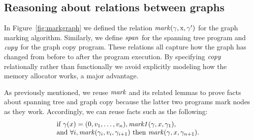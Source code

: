 
\vspace{-0.75ex}
\subsection{Reasoning about relations between graphs} %
\vspace{-0.75ex}
In Figure~\ref{fig:markgraph} we defined the relation $\mathit{mark}(\gamma, \text{x}, \gamma')$
for the graph marking algorithm.  Similarly, we define $\mathit{span}$ for the spanning tree program
and $\mathit{copy}$ for the graph copy program.
These relations all capture how the graph has changed from before to after the program
execution.  By specifying $\mathit{copy}$ relationally
rather than functionally we avoid explicitly modeling how the memory allocator works, a major advantage.

As previously mentioned, we reuse $\mathit{mark}$ and its
related lemmas to prove facts about spanning tree and graph copy
because the latter two programs mark nodes as they work.
Accordingly, we can reuse facts such as the following:
\[
\begin{array}{@{}l@{}}
\text{if } \gamma(x)=(0, v_1, \dots,v_n), \m{mark1}(\gamma, x, \gamma_1), \\
\text{and } \forall i, \m{mark}(\gamma_i,v_i,\gamma_{i+1}) \text{ then } \m{mark}(\gamma,x,\gamma_{n+1}).
\end{array}
\]


